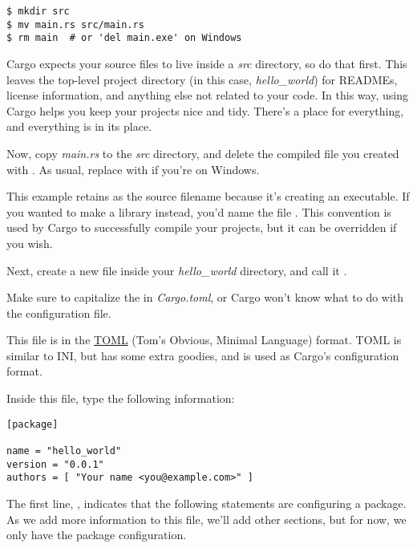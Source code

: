 \begin{verbatim}
$ mkdir src
$ mv main.rs src/main.rs
$ rm main  # or 'del main.exe' on Windows 
\end{verbatim}

Cargo expects your source files to live inside a \emph{src} directory, so do that first. This leaves the top-level 
project directory (in this case, \emph{hello\_world}) for READMEs, license information, and anything else not related 
to your code. In this way, using Cargo helps you keep your projects nice and tidy. There's a place for everything, 
and everything is in its place.

\blank

Now, copy \emph{main.rs} to the \emph{src} directory, and delete the compiled file you created with . As usual, 
replace  with  if you're on Windows.

\blank

This example retains  as the source filename because it's creating an executable. If you wanted to make a 
library instead, you'd name the file . This convention is used by Cargo to successfully compile your projects, 
but it can be overridden if you wish.


Next, create a new file inside your \emph{hello\_world} directory, and call it .

\blank

Make sure to capitalize the  in \emph{Cargo.toml}, or Cargo won't know what to do with the configuration file.

\blank

This file is in the \href{https://github.com/toml-lang/toml}{TOML} (Tom's Obvious, Minimal Language) format. TOML is similar 
to INI, but has some extra goodies, and is used as Cargo’s configuration format.

\blank

Inside this file, type the following information:

\begin{verbatim}
[package]

name = "hello_world"
version = "0.0.1"
authors = [ "Your name <you@example.com>" ] 
\end{verbatim}

The first line, \code{[package]}, indicates that the following statements are configuring a package. As we add more information 
to this file, we’ll add other sections, but for now, we only have the package configuration.

